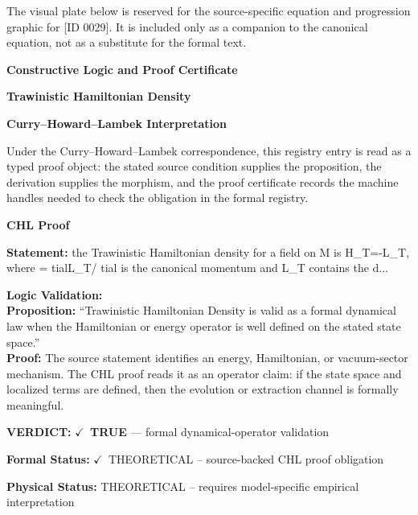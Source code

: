 \begingroup\footnotesize\sloppy
The visual plate below is reserved for the source-specific equation and progression graphic for [ID 0029]. It is included only as a companion to the canonical equation, not as a substitute for the formal text.
\par\endgroup
\ifTZPDarkEdition
{}
\fi

\clearpage
\begingroup\tzpsupportsetup
\noindent\textbf{\fontsize{10.8pt}{12.8pt}\selectfont [ID 0029] Constructive Logic and Proof Certificate}\par
\noindent\textbf{\fontsize{10pt}{12pt}\selectfont Trawinistic Hamiltonian Density}\par
\vspace{0.45em}
\begingroup
\footnotesize
\setlength{\parskip}{0.22em}
\setlength{\parindent}{0pt}
\noindent\textbf{Curry--Howard--Lambek Interpretation}\par
Under the Curry--Howard--Lambek correspondence, this registry entry is read as a typed proof
object: the stated source condition supplies the proposition, the derivation supplies the
morphism, and the proof certificate records the machine handles needed to check the obligation
in the formal registry.

\vspace{0.45em}
\noindent\textbf{CHL Proof}\par
\textbf{Statement:} the Trawinistic Hamiltonian density for a field  on M is H\_T=-L\_T, where =
tialL\_T/ tial is the canonical momentum and L\_T contains the d...

\textbf{Logic Validation:}\\
\textbf{Proposition:} ``Trawinistic Hamiltonian Density is valid as a formal dynamical law when the Hamiltonian
or energy operator is well defined on the stated state space.''\\
\textbf{Proof:} The source statement identifies an energy, Hamiltonian, or vacuum-sector mechanism. The
CHL proof reads it as an operator claim: if the state space and localized terms are
defined, then the evolution or extraction channel is formally meaningful.

\textbf{VERDICT:} \ensuremath{\checkmark}\ \textbf{TRUE} --- formal dynamical-operator validation

\textbf{Formal Status:} \ensuremath{\checkmark}\ THEORETICAL -- source-backed CHL proof obligation

\textbf{Physical Status:} THEORETICAL -- requires model-specific empirical interpretation
\par\vspace{0.45em}
\par
\ifTZPDarkEdition
{}
\fi
\endgroup
\endgroup
